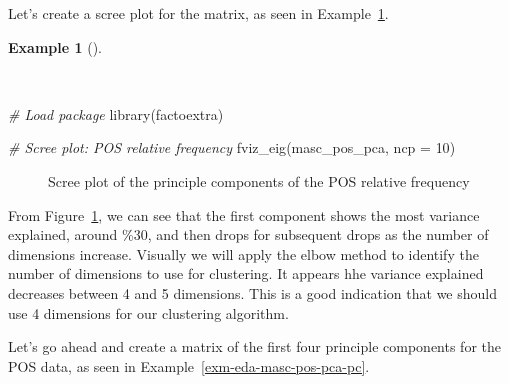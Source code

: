 \documentclass[
  letterpaper,
]{latex/krantz}
\newenvironment{Shaded}{\begin{snugshade}}{\end{snugshade}}
\newcommand{\AttributeTok}[1]{\textcolor[rgb]{0.00,0.00,0.00}{#1}}
\newcommand{\CommentTok}[1]{\textcolor[rgb]{0.00,0.00,0.00}{\textit{#1}}}
\newcommand{\DecValTok}[1]{\textcolor[rgb]{0.00,0.00,0.00}{#1}}
\newcommand{\FunctionTok}[1]{\textcolor[rgb]{0.00,0.00,0.00}{#1}}
\newcommand{\NormalTok}[1]{\textcolor[rgb]{0.00,0.00,0.00}{#1}}
\theoremstyle{definition}
\newtheorem{example}{Example}[chapter]
\theoremstyle{remark}
\begin{document}
Let's create a scree plot for the matrix, as seen in
Example~\ref{exm-eda-masc-dtms-pca-scree}.

\begin{example}[]\protect\hypertarget{exm-eda-masc-dtms-pca-scree}{}\label{exm-eda-masc-dtms-pca-scree}

~

\begin{Shaded}
\begin{Highlighting}[]
\CommentTok{\# Load package}
\FunctionTok{library}\NormalTok{(factoextra)}

\CommentTok{\# Scree plot: POS relative frequency}
\FunctionTok{fviz\_eig}\NormalTok{(masc\_pos\_pca, }\AttributeTok{ncp =} \DecValTok{10}\NormalTok{)}
\end{Highlighting}
\end{Shaded}

\begin{figure}[H]


\caption{\label{fig-eda-masc-dtms-pca-scree}Scree plot of the principle
components of the POS relative frequency}

\end{figure}%

\end{example}

From Figure~\ref{fig-eda-masc-dtms-pca-scree}, we can see that the first
component shows the most variance explained, around \%30, and then drops
for subsequent drops as the number of dimensions increase. Visually we
will apply the elbow method to identify the number of dimensions to use
for clustering. It appears hhe variance explained decreases between 4
and 5 dimensions. This is a good indication that we should use 4
dimensions for our clustering algorithm.

Let's go ahead and create a matrix of the first four principle
components for the POS data, as seen in
Example~\ref{exm-eda-masc-pos-pca-pc}.
\end{document}
